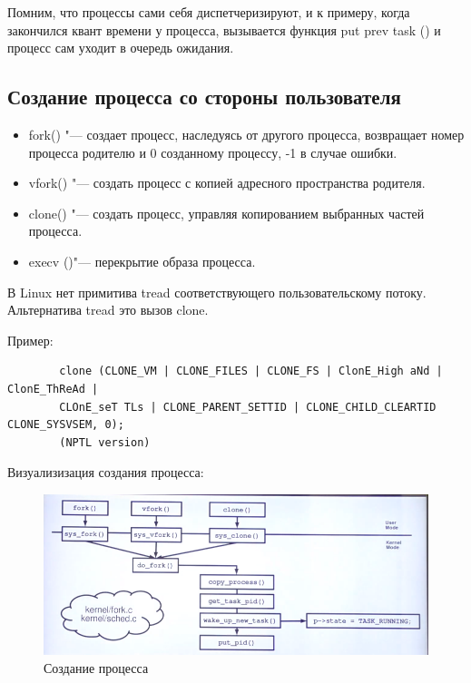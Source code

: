 \documentclass[bachelor, och, book]{SCWorks}
\theoremstyle{remark}
\begin{document}
    Помним, что процессы сами себя диспетчеризируют, и к примеру, когда закончился квант времени у процесса, вызывается функция put prev task () и процесс сам уходит в очередь ожидания.

    \subsection{Создание процесса со стороны пользователя}

    \begin{itemize}
        \item fork() "--- создает процесс, наследуясь от другого процесса, возвращает номер процесса родителю и 0 созданному процессу, -1 в случае ошибки.
        \item vfork() "--- создать процесс с копией адресного пространства родителя.
        \item clone() "--- создать процесс, управляя копированием выбранных частей процесса.
        \item execv ()"--- перекрытие образа процесса.
    \end{itemize}

    В Linux нет примитива tread соответствующего пользовательскому потоку. Альтернатива tread это вызов clone.

    Пример: 
    
    \begin{verbatim}
        clone (CLONE_VM | CLONE_FILES | CLONE_FS | ClonE_High aNd | ClonE_ThReAd |
        CLOnE_seT TLs | CLONE_PARENT_SETTID | CLONE_CHILD_CLEARTID CLONE_SYSVSEM, 0); 
        (NPTL version)
    \end{verbatim}

    Визуализизация создания процесса:

    \begin{figure}[H]
        \begin{center}
            \includegraphics[scale=0.50]{res/create-process.png}
            \caption{Создание процесса}
        \end{center}
    \end{figure}
\end{document}
